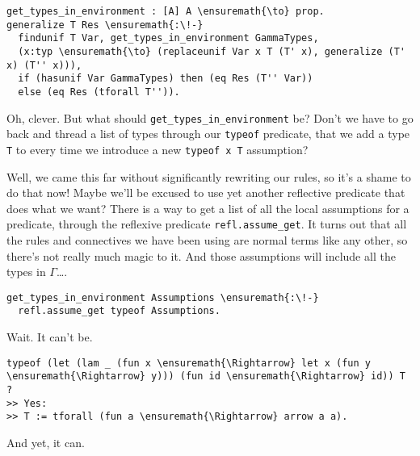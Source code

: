 \begin{verbatim}
get_types_in_environment : [A] A \ensuremath{\to} prop.
generalize T Res \ensuremath{:\!-}
  findunif T Var, get_types_in_environment GammaTypes,
  (x:typ \ensuremath{\to} (replaceunif Var x T (T' x), generalize (T' x) (T'' x))),
  if (hasunif Var GammaTypes) then (eq Res (T'' Var))
  else (eq Res (tforall T'')).
\end{verbatim}

\identDialog

\heroSTUDENT{} Oh, clever. But what should
\texttt{get\_types\_in\_environment} be? Don't we have to go back and
thread a list of types through our \texttt{typeof} predicate, that we
add a type \texttt{T} to every time we introduce a new
\texttt{typeof\ x\ T} assumption?

\heroADVISOR{} Well, we came this far without significantly rewriting our
rules, so it's a shame to do that now! Maybe we'll be excused to use yet
another reflective predicate that does what we want? There is a way to
get a list of all the local assumptions for a predicate, through the
reflexive predicate \texttt{refl.assume\_get}. It turns out that all the
rules and connectives we have been using are normal \lamprolog terms
like any other, so there's not really much magic to it. And those
assumptions will include all the types in \(\Gamma\)\ldots{}.

\begin{verbatim}
get_types_in_environment Assumptions \ensuremath{:\!-}
  refl.assume_get typeof Assumptions.
\end{verbatim}

\heroSTUDENT{} Wait. It can't be.

\begin{verbatim}
typeof (let (lam _ (fun x \ensuremath{\Rightarrow} let x (fun y \ensuremath{\Rightarrow} y))) (fun id \ensuremath{\Rightarrow} id)) T ?
>> Yes:
>> T := tforall (fun a \ensuremath{\Rightarrow} arrow a a).
\end{verbatim}

\heroADVISOR{} And yet, it can.
